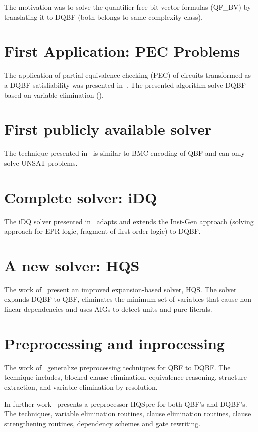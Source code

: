 \documentclass{article}
\begin{document}
The motivation was to solve the quantifier-free bit-vector formulas (QF\_BV) by translating it to DQBF (both belongs to same complexity class).

\section{First Application: PEC Problems}
The application of partial equivalence checking (PEC) of circuits transformed as a DQBF satisfiability was presented in~\cite{gitina2013equivalence}.
%
The presented algorithm solve DQBF based on variable elimination (\cite{biere2004resolve}).

\section{First publicly available solver}
The technique presented in~\cite{finkbeiner2014fast} is similar to BMC encoding of QBF and can only solve UNSAT problems.  

\section{Complete solver: iDQ}
The iDQ solver presented in~\cite{frohlich2014idq} adapts and extends the Inst-Gen approach (solving approach for EPR logic, fragment of first order logic) to DQBF.

\section{A new solver: HQS}
The work of~\cite{gitina2015solving} present an improved expansion-based solver, HQS.
%
The solver expands DQBF to QBF, eliminates the minimum set of variables that cause non-linear
dependencies and uses AIGs to detect units and pure literals.

\section{Preprocessing and inprocessing}
The work of~\cite{wimmer2015preprocessing} generalize preprocessing techniques for QBF to DQBF. 
%
The technique includes, blocked clause elimination, equivalence reasoning, structure extraction, and variable elimination by resolution.

In further work~\cite{wimmer2017hqspre} presents a preprocessor HQSpre for both QBF's and DQBF's.
%
The techniques, variable elimination routines, clause elimination routines, clause strengthening routines, dependency schemes and gate rewriting.
\end{document}
